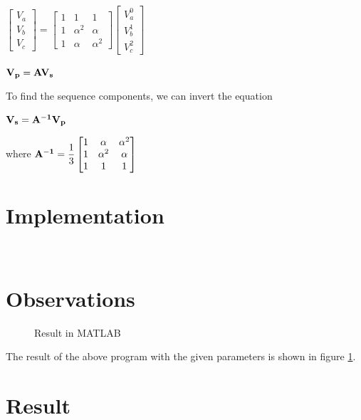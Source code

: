 \documentclass[a4paper,12pt]{article}
\begin{document}
    \begin{center}
      \begin{math}
        \begin{bmatrix}
          V_a \\ V_b \\ V_c
        \end{bmatrix}
        =
        \begin{bmatrix}
          1 & 1        & 1 \\
          1 & \alpha^2 & \alpha \\
          1 & \alpha   & \alpha^2
        \end{bmatrix}
        \begin{bmatrix}
          V^0_a \\ V^1_b \\ V^2_c
        \end{bmatrix}
      \end{math}
    \end{center}

    \begin{center}
      $ \bf V_p = A V_s $\\
    \end{center}

    To find the sequence components, we can invert the equation
    \begin{center}
      $ \bf V_s = A^{-1} V_p $
    \end{center}

    \begin{center}
      where
      \begin{math}
        {\bf A^{-1}} =
        \dfrac{1}{3}
        \begin{bmatrix}
          1 & \alpha   & \alpha^2 \\
          1 & \alpha^2 & \alpha \\
          1 & 1        & 1
        \end{bmatrix}
      \end{math}
    \end{center}

  \pagebreak
  \section{Implementation}
  \begin{lstlisting}
    
  \end{lstlisting}

  \section{Observations}
  \begin{figure}[H]
    \centering
    \caption{Result in MATLAB}
    \label{result}
  \end{figure}
  The result of the above program with the given parameters 
  is shown in figure \ref{result}.

  \section{Result}
\end{document}
